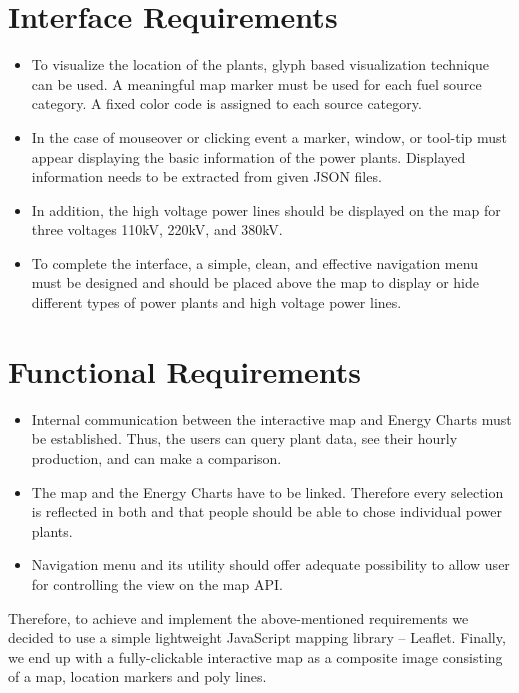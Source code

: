 \section*{Interface Requirements}
\begin{itemize}
	\item{To visualize the location of the plants, glyph based visualization technique can be used. A meaningful map marker must be used for each fuel source category. A fixed color code is assigned to each source category.}
	\item{In the case of mouseover or clicking event a marker, window, or tool-tip must appear displaying the basic information of the power plants. Displayed information needs to be extracted from given JSON files.}
	\item{In addition, the high voltage power lines should be displayed on the map for three voltages 110kV, 220kV, and 380kV.}
	\item{To complete the interface, a simple, clean, and effective navigation menu must be designed and should be placed above the map to display or hide different types of power plants and high voltage power lines.}
\end{itemize}

\section*{Functional Requirements}

\begin{itemize}
	\item{Internal communication between the interactive map and Energy Charts must be established. Thus, the users can query plant data, see their hourly production, and can make a comparison.}
	\item{The map and the Energy Charts have to be linked. Therefore every selection is reflected in both and that people should be able to chose individual power plants.}
	\item{Navigation menu and its utility  should offer adequate possibility to allow user for controlling the view on the map API.}
\end{itemize}

Therefore, to achieve and implement the above-mentioned requirements we decided to use a simple lightweight JavaScript mapping library – Leaflet.  Finally, we end up with a fully-clickable interactive map as a composite image consisting of a map, location markers and poly lines. 

